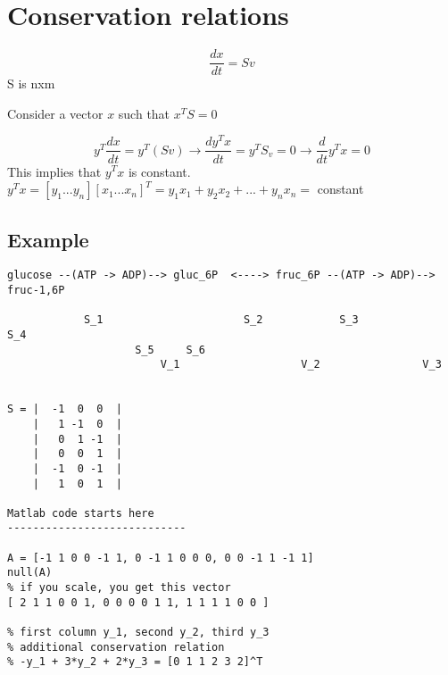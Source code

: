 \documentclass[10pt]{article}
\begin{document}
\section*{Conservation relations}
\[ \frac{dx}{dt} = S v \] S is nxm

Consider a vector $x$ such that $x^T S = 0$

\[ y^T \frac{dx}{dt} = y^T(S v) \rightarrow \frac{dy^T x}{dt} = y^T S_v = 0 \rightarrow \frac{d}{dt}y^T x = 0 \]
This implies that $y^T x$ is constant. $y^T x = [y_1 ... y_n] [x_1 ... x_n]^T = y_1 x_1 + y_2 x_2 + ... + y_n x_n = $ constant

\subsection*{Example}
\begin{verbatim}
glucose --(ATP -> ADP)--> gluc_6P  <----> fruc_6P --(ATP -> ADP)--> fruc-1,6P

            S_1                      S_2            S_3                         S_4
                    S_5     S_6
                        V_1                   V_2                V_3


S = |  -1  0  0  |
    |   1 -1  0  |
    |   0  1 -1  |
    |   0  0  1  |
    |  -1  0 -1  |
    |   1  0  1  |
    
Matlab code starts here
----------------------------

A = [-1 1 0 0 -1 1, 0 -1 1 0 0 0, 0 0 -1 1 -1 1]
null(A)
% if you scale, you get this vector
[ 2 1 1 0 0 1, 0 0 0 0 1 1, 1 1 1 1 0 0 ]

% first column y_1, second y_2, third y_3
% additional conservation relation
% -y_1 + 3*y_2 + 2*y_3 = [0 1 1 2 3 2]^T
\end{verbatim}
\end{document}
